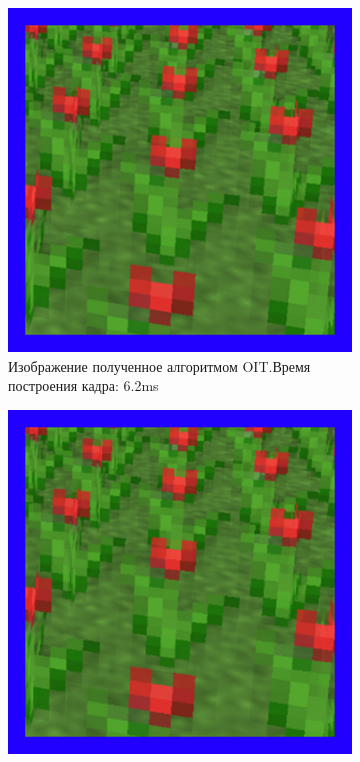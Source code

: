 			\begin{figure}[!htbp]
				\centering
				\begin{subfigure}[b]{0.3\textwidth}
					\centering
					\includegraphics[width=\textwidth]{my_folder/images//oit_flower}
					\caption{Изображение полученное алгоритмом OIT.\linebreak Время построения кадра: 6.2ms}
					\label{fig:oit_flower}
				\end{subfigure}
				\begin{subfigure}[b]{0.3\textwidth}
					\centering
					\includegraphics[width=\textwidth]{my_folder/images//hybrid_flower}

\end{subfigure}
\end{figure}
